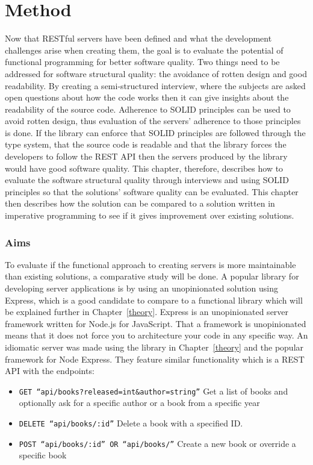 \chapter{Method}\label{method}

Now that RESTful servers have been defined and what the development challenges
arise when creating them, the goal is to evaluate the potential of functional
programming for better software quality. Two things need to be addressed for
software structural quality: the avoidance of rotten design and good
readability. By creating a semi-structured interview, where the subjects are
asked open questions about how the code works then it can give insights about
the readability of the source code. Adherence to SOLID principles can be used
to avoid rotten design, thus evaluation of the servers' adherence to those
principles is done. If the library can enforce that SOLID principles are
followed through the type system, that the source code is readable and that the
library forces the developers to follow the REST API then the servers produced
by the library would have good software quality. This chapter, therefore,
describes how to evaluate the software structural quality through interviews
and using SOLID principles so that the solutions' software quality can be
evaluated. This chapter then describes how the solution can be compared to a
solution written in imperative programming to see if it gives improvement over
existing solutions.

\subsection{Aims}

To evaluate if the functional approach to creating servers is more maintainable
than existing solutions, a comparative study will be done.  A popular library
for developing server applications is by using an unopinionated solution using
Express, which is a good candidate to compare to a functional library which will
be explained further in Chapter~\ref{theory}.  Express is an unopinionated
server framework written for Node.js for JavaScript.  That a framework is
unopinionated means that it does not force you to architecture your code in any
specific way. An idiomatic server was made using the library in
Chapter~\ref{theory} and the popular framework for Node Express. They feature
similar functionality which is a REST API with the endpoints:

\begin{itemize}
    \item \texttt{GET ``api/books?released=int\&author=string''} Get a list of
    books and optionally ask for a specific author or a book from a specific
    year
    \item \texttt{DELETE ``api/books/:id''} Delete a book with a specified ID.
    \item \texttt{POST ``api/books/:id'' OR ``api/books/''} Create a new book or
    override a specific book
\end{itemize}

